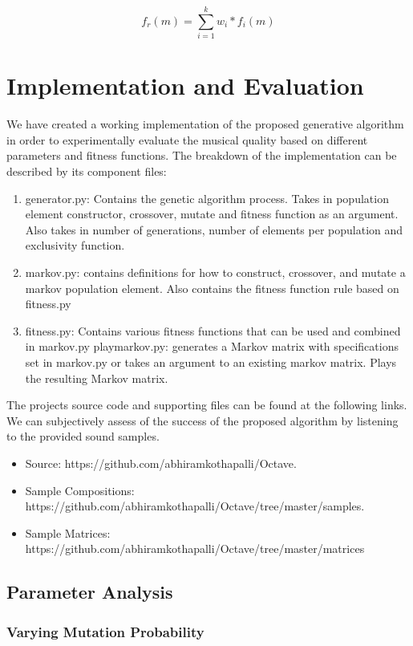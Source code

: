 \documentclass{article}
\begin{document}
\[
f_r(m) = \sum_{i = 1}^k{w_i * f_i (m)}
\]

\section{Implementation and Evaluation}

We have created a working implementation of the proposed generative algorithm in order to experimentally evaluate the musical quality based on different parameters and fitness functions. The breakdown of the implementation can be described by its component files:

\begin{enumerate}
\item generator.py: Contains the genetic algorithm process. Takes in population element constructor, crossover, mutate and fitness function as an argument. Also takes in number of generations, number of elements per population and exclusivity function.
\item markov.py: contains definitions for how to construct, crossover, and mutate a markov population element. Also contains the fitness function rule based on fitness.py
\item fitness.py: Contains various fitness functions that can be used and combined in markov.py
playmarkov.py: generates a Markov matrix with specifications set in markov.py or takes an argument to an existing markov matrix. Plays the resulting Markov matrix.
\end{enumerate}

The projects source code and supporting files can be found at the following links. We can subjectively assess of the success of the proposed algorithm by listening to the provided sound samples.


\begin{itemize}
\item Source: https://github.com/abhiramkothapalli/Octave.
\item Sample Compositions: https://github.com/abhiramkothapalli/Octave/tree/master/samples.
\item Sample Matrices: https://github.com/abhiramkothapalli/Octave/tree/master/matrices
\end{itemize}

\subsection{Parameter Analysis}

\subsubsection{Varying Mutation Probability}
\end{document}
